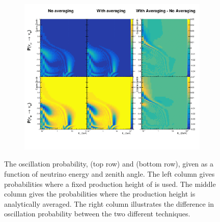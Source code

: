 \begin{figure}[h]
  \begin{subfigure}[t]{\textwidth}
    \includegraphics[width=\textwidth, trim={0mm 0mm 0mm 0mm}, clip,page=1]{Figures/Oscillation/ProductionHeightAveraging.pdf}
  \end{subfigure}
  \caption{The oscillation probability,  (top row) and  (bottom row), given as a function of neutrino energy and zenith angle. The left column gives probabilities where a fixed production height of  is used. The middle column gives the probabilities where the production height is analytically averaged. The right column illustrates the difference in oscillation probability between the two different techniques.}
  \label{fig:Oscillation_SK_ProductionHeightAveraging}
\end{figure}
